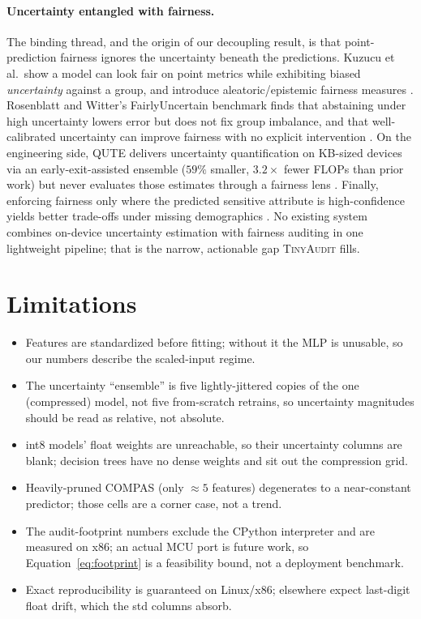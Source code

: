 \documentclass[11pt]{article}
\newcommand{\dataset}[1]{\textsc{#1}}
\begin{document}
\paragraph{Uncertainty entangled with fairness.} The binding thread, and the
origin of our decoupling result, is that point-prediction fairness ignores the
uncertainty beneath the predictions. Kuzucu et al.\ show a model can look fair on
point metrics while exhibiting biased \emph{uncertainty} against a group, and
introduce aleatoric/epistemic fairness measures \cite{kuzucu2024uncertainty}.
Rosenblatt and Witter's FairlyUncertain benchmark finds that abstaining under
high uncertainty lowers error but does not fix group imbalance, and that
well-calibrated uncertainty can improve fairness with no explicit intervention
\cite{rosenblatt2024fairlyuncertain}. On the engineering side, QUTE delivers
uncertainty quantification on KB-sized devices via an early-exit-assisted
ensemble ($59\%$ smaller, $3.2\times$ fewer FLOPs than prior work) but never
evaluates those estimates through a fairness lens \cite{ghanathe2024qute}.
Finally, enforcing fairness only where the predicted sensitive attribute is
high-confidence yields better trade-offs under missing demographics
\cite{kenfack2023fairness}. No existing system combines on-device uncertainty
estimation with fairness auditing in one lightweight pipeline; that is the
narrow, actionable gap \textsc{TinyAudit} fills.

\section{Limitations}
\label{sec:limitations}
\begin{itemize}
    \item Features are standardized before fitting; without it the MLP is
    unusable, so our numbers describe the scaled-input regime.
    \item The uncertainty ``ensemble'' is five lightly-jittered copies of the one
    (compressed) model, not five from-scratch retrains, so uncertainty magnitudes
    should be read as relative, not absolute.
    \item int8 models' float weights are unreachable, so their uncertainty columns
    are blank; decision trees have no dense weights and sit out the compression
    grid.
    \item Heavily-pruned \dataset{COMPAS} (only $\approx 5$ features) degenerates
    to a near-constant predictor; those cells are a corner case, not a trend.
    \item The audit-footprint numbers exclude the CPython interpreter and are
    measured on x86; an actual MCU port is future work, so
    Equation~\ref{eq:footprint} is a feasibility bound, not a deployment
    benchmark.
    \item Exact reproducibility is guaranteed on Linux/x86; elsewhere expect
    last-digit float drift, which the std columns absorb.
\end{itemize}
\end{document}
